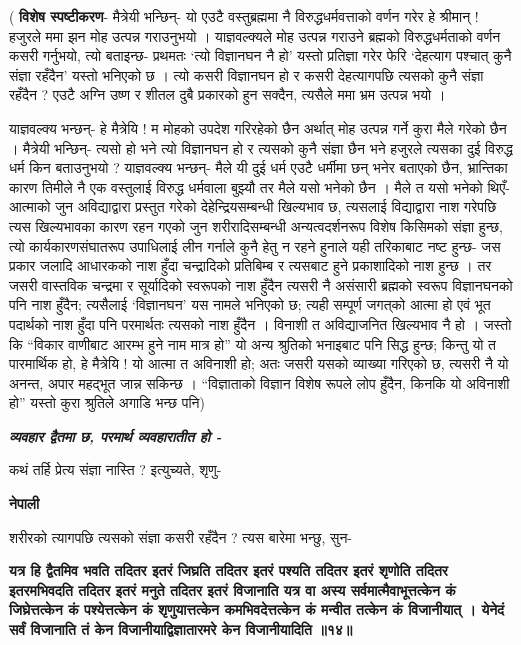 \documentclass[11pt, a5paper]{article}
\begin{document}
( \textbf{विशेष स्पष्टीकरण}- मैत्रेयी भन्छिन्- यो एउटै वस्तुब्रह्ममा नै विरुद्धधर्मवत्ताको वर्णन गरेर हे श्रीमान्‌ ! हजुरले ममा झन मोह उत्पन्न गराउनुभयो । याज्ञवल्क्यले मोह उत्पन्न गराउने ब्रह्मको विरुद्धधर्मताको वर्णन कसरी गर्नुभयो, त्यो बताइन्छ- प्रथमतः ‘त्यो विज्ञानघन नै हो’ यस्तो प्रतिज्ञा गरेर फेरि ‘देहत्याग पश्चात् कुनै संज्ञा रहँदैन’ यस्तो भनिएको छ । त्यो कसरी विज्ञानघन हो र कसरी देहत्यागपछि त्यसको कुनै संज्ञा रहँदैन ? एउटै अग्नि उष्ण र शीतल दुबै प्रकारको हुन सक्दैन, त्यसैले ममा भ्रम उत्पन्न भयो ।

याज्ञवल्क्य भन्छन्- हे मैत्रेयि ! म मोहको उपदेश गरिरहेको छैन अर्थात् मोह उत्पन्न गर्ने कुरा मैले गरेको छैन । मैत्रेयी भन्छिन्- त्यसो हो भने त्यो विज्ञानघन हो र त्यसको कुनै संज्ञा छैन भने हजुरले त्यसका दुई विरुद्ध धर्म किन बताउनुभयो ? याज्ञवल्क्य भन्छन्- मैले यी दुई धर्म एउटै धर्मीमा छन् भनेर बताएको छैन, भ्रान्तिका कारण तिमीले नै एक वस्तुलाई विरुद्ध धर्मवाला बुझ्यौ तर मैले यसो भनेको छैन । मैले त यसो भनेको थिएँ- आत्माको जुन अविद्याद्वारा प्रस्तुत गरेको देहेन्द्रियसम्बन्धी खिल्यभाव छ, त्यसलाई विद्याद्वारा नाश गरेपछि त्यस खिल्यभावका कारण रहन गएको जुन शरीरादिसम्बन्धी अन्यत्वदर्शनरूप विशेष किसिमको संज्ञा हुन्छ, त्यो कार्यकारणसंघातरूप उपाधिलाई लीन गर्नाले कुनै हेतु न रहने हुनाले यही तरिकाबाट नष्ट हुन्छ- जस प्रकार जलादि आधारकको नाश हुँदा चन्द्रादिको प्रतिबिम्ब र त्यसबाट हुने प्रकाशादिको नाश हुन्छ । तर जसरी वास्तविक चन्द्रमा र सूर्यादिको स्वरूपको नाश हुँदैन त्यसरी नै असंसारी ब्रह्मको स्वरूप विज्ञानघनको पनि नाश हुँदैन; त्यसैलाई ‘विज्ञानघन’ यस नामले भनिएको छ; त्यही सम्पूर्ण जगत्‌को आत्मा हो एवं भूत पदार्थको नाश हुँदा पनि परमार्थतः त्यसको नाश हुँदैन । विनाशी त अविद्याजनित खिल्यभाव नै हो । जस्तो कि “विकार वाणीबाट आरम्भ हुने नाम मात्र हो” यो अन्य श्रुतिको भनाइबाट पनि सिद्ध हुन्छ; किन्तु यो त पारमार्थिक हो, हे मैत्रेयि ! यो आत्मा त अविनाशी हो; अतः जसरी यसको व्याख्या गरिएको छ, त्यसरी नै यो अनन्त, अपार महद्‍भूत जान्न सकिन्छ । “विज्ञाताको विज्ञान विशेष रूपले लोप हुँदैन, किनकि यो अविनाशी हो” यस्तो कुरा श्रुतिले अगाडि भन्छ पनि)

\textit{\textbf{व्यवहार द्वैतमा छ, परमार्थ व्यवहारातीत हो -}}

कथं तर्हि प्रेत्य संज्ञा नास्ति ? इत्युच्यते, शृणु-

\textbf{नेपाली}

शरीरको त्यागपछि त्यसको संज्ञा कसरी रहँदैन ? त्यस बारेमा भन्छु, सुन-

\textbf{यत्र हि द्वैतमिव भवति तदितर इतरं जिघ्रति तदितर इतरं पश्यति तदितर इतरं शृणोति तदितर इतरमभिवदति तदितर इतरं मनुते तदितर इतरं विजानाति यत्र वा अस्य सर्वमात्मैवाभूत्तत्केन कं जिघ्रेत्तत्केन कं पश्येत्तत्केन कं शृणुयात्तत्केन कमभिवदेत्तत्केन कं मन्वीत तत्केन कं विजानीयात् । येनेदं सर्वं विजानाति तं केन विजानीयाद्विज्ञातारमरे केन विजानीयादिति ॥१४॥}
\end{document}
